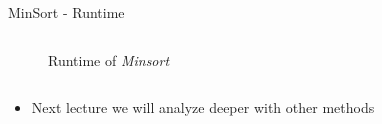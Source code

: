 \begin{frame}{MinSort - Runtime}
\begin{columns}
\begin{column}[t]{0.45\textwidth}
\begin{center}
\begin{figure}[!h]
          \vspace*{-1.0em}\caption{Runtime of \textit{Minsort}}%
          \label{fig:minsort_runtime_2}%
        \end{figure}%
      \end{center}
    \end{column}%
  \end{columns}
  \begin{columns}
    \begin{column}{1.0\textwidth}
      \begin{itemize}
        \item<3- |handout:1>
          Next lecture we will analyze deeper with other methods
      \end{itemize}
    \end{column}
    \begin{column}{0.0\textwidth}\end{column}
  \end{columns}
\end{frame}